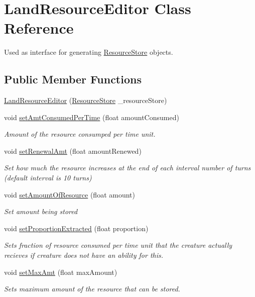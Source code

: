 \hypertarget{class_land_resource_editor}{}\section{Land\+Resource\+Editor Class Reference}
\label{class_land_resource_editor}


Used as interface for generating \mbox{\hyperlink{class_resource_store}{Resource\+Store}} objects.  


\subsection*{Public Member Functions}
\begin{DoxyCompactItemize}
\item 
\mbox{\hyperlink{class_land_resource_editor_ac8aacd2b8ec7329ec261665c0068f356}{Land\+Resource\+Editor}} (\mbox{\hyperlink{class_resource_store}{Resource\+Store}} \+\_\+resource\+Store)
\item 
void \mbox{\hyperlink{class_land_resource_editor_a5d3bfebc77d458924048d2ce42c25c55}{set\+Amt\+Consumed\+Per\+Time}} (float amount\+Consumed)
\begin{DoxyCompactList}\small\item\em Amount of the resource consumped per time unit. \end{DoxyCompactList}\item 
void \mbox{\hyperlink{class_land_resource_editor_a78ac1e33157301f579816da8fe86b8a1}{set\+Renewal\+Amt}} (float amount\+Renewed)
\begin{DoxyCompactList}\small\item\em Set how much the resource increases at the end of each interval number of turns (default interval is 10 turns) \end{DoxyCompactList}\item 
void \mbox{\hyperlink{class_land_resource_editor_a5390ac74d63e553c155fd515a6a035e0}{set\+Amount\+Of\+Resource}} (float amount)
\begin{DoxyCompactList}\small\item\em Set amount being stored \end{DoxyCompactList}\item 
void \mbox{\hyperlink{class_land_resource_editor_a2b401ce42af2c51063542978f500ccc1}{set\+Proportion\+Extracted}} (float proportion)
\begin{DoxyCompactList}\small\item\em Sets fraction of resource consumed per time unit that the creature actually recieves if creature does not have an ability for this. \end{DoxyCompactList}\item 
void \mbox{\hyperlink{class_land_resource_editor_a7f7cf4e6c7dacb9028a155dae2428e71}{set\+Max\+Amt}} (float max\+Amount)
\begin{DoxyCompactList}\small\item\em Sets maximum amount of the resource that can be stored. \end{DoxyCompactList}\end{DoxyCompactItemize}
